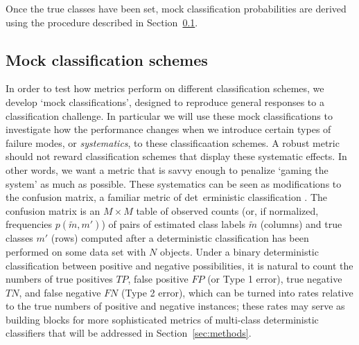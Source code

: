 Once the true classes have been set, mock classification probabilities are derived using the procedure described in Section~\ref{sec:mockdata}.

\subsection{Mock classification schemes}
\label{sec:mockdata}

In order to test how metrics perform on different classification schemes, we develop `mock classifications', designed to reproduce general responses to a classification challenge. In particular we will use these mock classifications to investigate how the performance changes when we introduce certain types of failure modes, or \textit{systematics}, to these classificaation schemes. A robust metric should not reward classification schemes that display these systematic effects. In other words, we want a metric that is savvy enough to penalize `gaming the system' as much as possible.
These systematics can be seen as modifications to the confusion matrix, a familiar metric of det\
erministic classification \citep{bloom_automating_2012}. The confusion matrix is an $M \times M$ table of observed counts (or, if normalized, frequencies $p(\tilde{m}, m')$) of pairs of estimated class labels $\tilde{m}$ (columns) and true classes $m'$ (rows) computed after a deterministic classification has been performed on some data set with $N$ objects.
Under a binary deterministic classification between positive and negative possibilities, it is natural to count the numbers of true positives $TP$, false positive $FP$ (or Type 1 error), true negative $TN$, and false negative $FN$ (Type 2 error), which can be turned into rates relative to the true numbers of positive and negative instances; these rates may serve as building blocks for more sophisticated metrics of multi-class deterministic classifiers that will be addressed in Section~\ref{sec:methods}.

